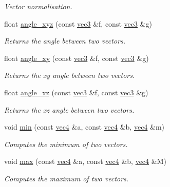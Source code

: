 \begin{DoxyCompactItemize}
\begin{DoxyCompactList}\small\item\em Vector normalisation. \end{DoxyCompactList}\item 
float \hyperlink{namespacephysim_1_1math_a5fdfad1a0bf0be5c6d6cba9ecc45c037}{angle\+\_\+xyz} (const \hyperlink{structphysim_1_1math_1_1vec3}{vec3} \&f, const \hyperlink{structphysim_1_1math_1_1vec3}{vec3} \&g)
\begin{DoxyCompactList}\small\item\em Returns the angle between two vectors. \end{DoxyCompactList}\item 
float \hyperlink{namespacephysim_1_1math_ac80bfe5ed2d96ff378869b6c087bc7df}{angle\+\_\+xy} (const \hyperlink{structphysim_1_1math_1_1vec3}{vec3} \&f, const \hyperlink{structphysim_1_1math_1_1vec3}{vec3} \&g)
\begin{DoxyCompactList}\small\item\em Returns the xy angle between two vectors. \end{DoxyCompactList}\item 
float \hyperlink{namespacephysim_1_1math_a5e56aec5af787b18d3636ca9ae7340e2}{angle\+\_\+xz} (const \hyperlink{structphysim_1_1math_1_1vec3}{vec3} \&f, const \hyperlink{structphysim_1_1math_1_1vec3}{vec3} \&g)
\begin{DoxyCompactList}\small\item\em Returns the xz angle between two vectors. \end{DoxyCompactList}\item 
void \hyperlink{namespacephysim_1_1math_a45f0c59675615b717294abe00a7c268c}{min} (const \hyperlink{structphysim_1_1math_1_1vec4}{vec4} \&a, const \hyperlink{structphysim_1_1math_1_1vec4}{vec4} \&b, \hyperlink{structphysim_1_1math_1_1vec4}{vec4} \&m)
\begin{DoxyCompactList}\small\item\em Computes the minimum of two vectors. \end{DoxyCompactList}\item 
void \hyperlink{namespacephysim_1_1math_ab056fe88bcef66617badeee517327520}{max} (const \hyperlink{structphysim_1_1math_1_1vec4}{vec4} \&a, const \hyperlink{structphysim_1_1math_1_1vec4}{vec4} \&b, \hyperlink{structphysim_1_1math_1_1vec4}{vec4} \&M)
\begin{DoxyCompactList}\small\item\em Computes the maximum of two vectors. \end{DoxyCompactList}\item 

\end{DoxyCompactItemize}
